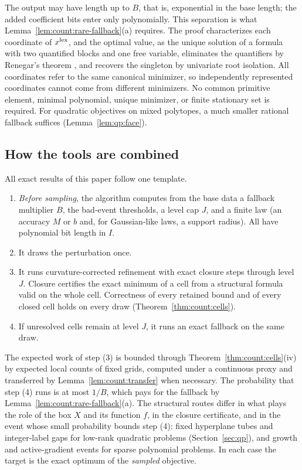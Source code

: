 The output may have length up to $B$, that is, exponential in the base
length; the added coefficient bits enter only polynomially. This separation
is what Lemma~\ref{lem:count:rare-fallback}(a) requires. The proof
characterizes each coordinate of $x^{\rm lex}$, and the optimal value, as the
unique solution of a formula with two quantified blocks and one free
variable, eliminates the quantifiers by Renegar's theorem
\cite{renegar1992-on-the-computational-complexity-and}, and recovers the
singleton by univariate root isolation. All coordinates refer to the same
canonical minimizer, so independently represented coordinates cannot come
from different minimizers. No common primitive element, minimal polynomial,
unique minimizer, or finite stationary set is required. For quadratic
objectives on mixed polytopes, a much smaller rational fallback suffices
(Lemma~\ref{lem:qp:face}).

\subsection{How the tools are combined}\label{sec:count:template}

All exact results of this paper follow one template.
\begin{enumerate}[label=(\arabic*)]
\item \emph{Before sampling,} the algorithm computes from the base data a
 fallback multiplier $B$, the bad-event thresholds, a level cap $J$, and a
 finite law (an accuracy $M$ or $b$ and, for Gaussian-like laws, a support
 radius). All have polynomial bit length in $I$.
\item It draws the perturbation once.
\item It runs curvature-corrected refinement with exact closure steps through
 level $J$. Closure certifies the exact minimum of a cell from a structural
 formula valid on the whole cell. Correctness of every retained bound and of
 every closed cell holds on every draw (Theorem~\ref{thm:count:cells}).
\item If unresolved cells remain at level $J$, it runs an exact fallback on
 the same draw.
\end{enumerate}
The expected work of step (3) is bounded through
Theorem~\ref{thm:count:cells}(iv) by expected local counts of fixed grids,
computed under a continuous proxy and transferred by
Lemma~\ref{lem:count:transfer} when necessary. The probability that step
(4) runs is at most $1/B$, which pays for the fallback by
Lemma~\ref{lem:count:rare-fallback}(a). The structural routes differ in what
plays the role of the box $X$ and its function $f$, in the closure
certificate, and in the event whose small probability bounds step (4):
fixed hyperplane tubes and integer-label gaps for low-rank quadratic
problems (Section~\ref{sec:qp}), and growth and active-gradient events for
sparse polynomial problems. In each case the target is the exact optimum of
the \emph{sampled} objective.
